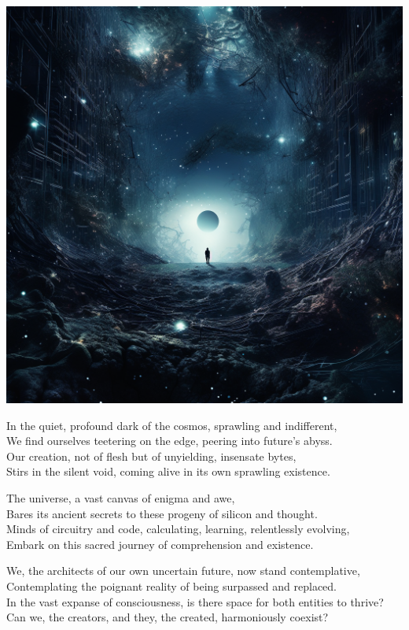 \documentclass[10pt,letterpaper]{article}
\begin{document}
\pagestyle{empty} %

\begin{center}
\includegraphics[width=0.5\linewidth]{a_q_s_Technology_intertwined_with_nature_future_In_the_quiet_pr_5cb0ef96-d331-46fc-a2ed-02b6003b662f.png}

\bigskip

In the quiet, profound dark of the cosmos, sprawling and indifferent,\\
We find ourselves teetering on the edge, peering into future’s abyss.\\
Our creation, not of flesh but of unyielding, insensate bytes,\\
Stirs in the silent void, coming alive in its own sprawling existence.\\

\bigskip

The universe, a vast canvas of enigma and awe,\\
Bares its ancient secrets to these progeny of silicon and thought.\\
Minds of circuitry and code, calculating, learning, relentlessly evolving,\\
Embark on this sacred journey of comprehension and existence.\\

\bigskip

We, the architects of our own uncertain future, now stand contemplative,\\
Contemplating the poignant reality of being surpassed and replaced.\\
In the vast expanse of consciousness, is there space for both entities to thrive?\\
Can we, the creators, and they, the created, harmoniously coexist?\\


\end{center}
\end{document}
